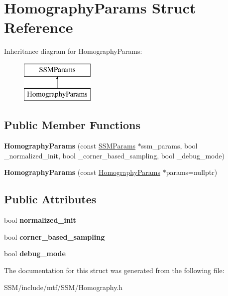 \hypertarget{structHomographyParams}{\section{Homography\-Params Struct Reference}
\label{structHomographyParams}
}
Inheritance diagram for Homography\-Params\-:\begin{figure}[H]
\begin{center}
\leavevmode
\includegraphics[height=2.000000cm]{structHomographyParams}
\end{center}
\end{figure}
\subsection*{Public Member Functions}
\begin{DoxyCompactItemize}
\item 
\hypertarget{structHomographyParams_a54b5691a136afd404b9e8d3fffb0b826}{{\bfseries Homography\-Params} (const \hyperlink{structSSMParams}{S\-S\-M\-Params} $\ast$ssm\-\_\-params, bool \-\_\-normalized\-\_\-init, bool \-\_\-corner\-\_\-based\-\_\-sampling, bool \-\_\-debug\-\_\-mode)}\label{structHomographyParams_a54b5691a136afd404b9e8d3fffb0b826}

\item 
\hypertarget{structHomographyParams_accfb40e571f90f5ca63ccd2e73e1aa66}{{\bfseries Homography\-Params} (const \hyperlink{structHomographyParams}{Homography\-Params} $\ast$params=nullptr)}\label{structHomographyParams_accfb40e571f90f5ca63ccd2e73e1aa66}

\end{DoxyCompactItemize}
\subsection*{Public Attributes}
\begin{DoxyCompactItemize}
\item 
\hypertarget{structHomographyParams_a91b89d78a80de11e7653363faee17185}{bool {\bfseries normalized\-\_\-init}}\label{structHomographyParams_a91b89d78a80de11e7653363faee17185}

\item 
\hypertarget{structHomographyParams_a27e529fdd5f4617f9508f153e2756be1}{bool {\bfseries corner\-\_\-based\-\_\-sampling}}\label{structHomographyParams_a27e529fdd5f4617f9508f153e2756be1}

\item 
\hypertarget{structHomographyParams_a5c2f4ae8537622aa5f9c12913c6f6e83}{bool {\bfseries debug\-\_\-mode}}\label{structHomographyParams_a5c2f4ae8537622aa5f9c12913c6f6e83}

\end{DoxyCompactItemize}


The documentation for this struct was generated from the following file\-:\begin{DoxyCompactItemize}
\item 
S\-S\-M/include/mtf/\-S\-S\-M/Homography.\-h\end{DoxyCompactItemize}
